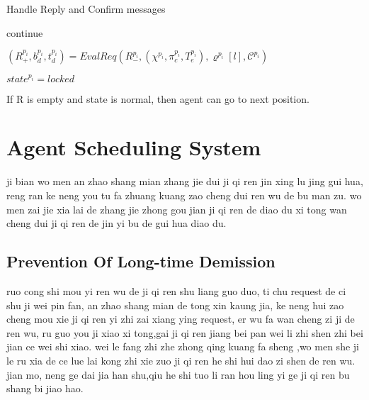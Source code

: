 \documentclass[journal]{IEEEtran}
\begin{document}
\begin{algorithm}
  \caption{Handle Reply and Confirm messages}
  {
    {
        {
            continue
        }
        {
            $(R^{p_i}_+,b^{p_i}_d,t^{p_i}_d)=EvalReq(R^{p_i}_-,(\chi^{p_i},\pi_c^{p_i},T^{p_i}_e),\varrho^{p_i}[l],\mathcal{C}^{p_i})$
            
            $state^{p_i}=locked$
        }
    }
  }
  {

  }
  {

  }
  \Return{}
\end{algorithm}
If R is empty and state is normal, then agent can go to next position.
\section{Agent Scheduling System}
ji bian wo men an zhao shang mian zhang jie dui ji qi ren jin xing lu jing gui hua, reng ran ke neng you tu fa zhuang kuang zao cheng dui ren wu de bu man zu. wo men zai jie xia lai de zhang jie zhong gou jian ji qi ren de diao du xi tong wan cheng dui ji qi ren de jin yi bu de gui hua diao du.
\subsection{Prevention Of Long-time Demission}
ruo cong shi mou yi ren wu de ji qi ren shu liang guo duo, ti chu request de ci shu ji wei pin fan, an zhao shang mian de tong xin kaung jia, ke neng hui zao cheng mou xie ji qi ren yi zhi zai xiang ying request, er wu fa wan cheng zi ji de ren wu, ru guo you ji xiao xi tong,gai ji qi ren jiang bei pan wei li zhi shen zhi bei jian ce wei shi xiao. wei le fang zhi zhe zhong qing kuang fa sheng ,wo men she ji le ru xia de ce lue lai kong zhi xie zuo ji qi ren he shi hui dao zi shen de ren wu.   jian mo, neng ge dai jia han shu,qiu he shi tuo li ran hou ling yi ge ji qi ren bu shang bi jiao hao.
\end{document}
